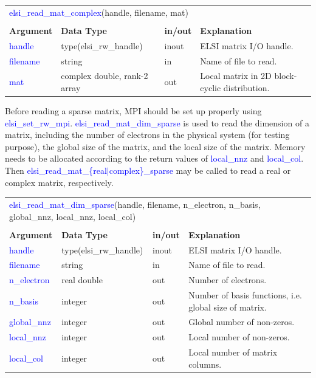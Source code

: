 \documentclass{report}
\newcommand{\tcb}[1]{\textcolor{blue}{#1}}
\begin{document}
\begin{tabular}[]{|p{20mm}|p{45mm}|p{15mm}|p{85mm}|}
\multicolumn{4}{l}{\tcb{elsi\_read\_mat\_complex}(handle, filename, mat)}\\
\multicolumn{4}{l}{}\\
\hline
\multicolumn{1}{|l|}{\textbf{Argument}} & \multicolumn{1}{l|}{\textbf{Data Type}} & \multicolumn{1}{l|}{\textbf{in/out}} & \multicolumn{1}{l|}{\textbf{Explanation}}\\
\hline
\tcb{handle}   & type(elsi\_rw\_handle)       & inout & ELSI matrix I/O handle.\\
\hline
\tcb{filename} & string                       & in    & Name of file to read.\\
\hline
\tcb{mat}      & complex double, rank-2 array & out   & Local matrix in 2D block-cyclic distribution.\\
\hline
\end{tabular}

Before reading a sparse matrix, MPI should be set up properly using \tcb{elsi\_set\_rw\_mpi}. \tcb{elsi\_read\_mat\_dim\_sparse} is used to read the dimension of a matrix, including the number of electrons in the physical system (for testing purpose), the global size of the matrix, and the local size of the matrix. Memory needs to be allocated according to the return values of \tcb{local\_nnz} and \tcb{local\_col}. Then \tcb{elsi\_read\_mat\_\{real$\vert$complex\}\_sparse} may be called to read a real or complex matrix, respectively.

\begin{tabular}[]{|p{20mm}|p{45mm}|p{15mm}|p{85mm}|}
\multicolumn{4}{l}{\tcb{elsi\_read\_mat\_dim\_sparse}(handle, filename, n\_electron, n\_basis, global\_nnz, local\_nnz, local\_col)}\\
\multicolumn{4}{l}{}\\
\hline
\multicolumn{1}{|l|}{\textbf{Argument}} & \multicolumn{1}{l|}{\textbf{Data Type}} & \multicolumn{1}{l|}{\textbf{in/out}} & \multicolumn{1}{l|}{\textbf{Explanation}}\\
\hline
\tcb{handle}      & type(elsi\_rw\_handle) & inout & ELSI matrix I/O handle.\\
\hline
\tcb{filename}    & string                 & in    & Name of file to read.\\
\hline
\tcb{n\_electron} & real double            & out   & Number of electrons.\\
\hline
\tcb{n\_basis}    & integer                & out   & Number of basis functions, i.e. global size of matrix.\\
\hline
\tcb{global\_nnz} & integer                & out   & Global number of non-zeros.\\
\hline
\tcb{local\_nnz}  & integer                & out   & Local number of non-zeros.\\
\hline
\tcb{local\_col}  & integer                & out   & Local number of matrix columns.\\
\hline
\end{tabular}
\end{document}
